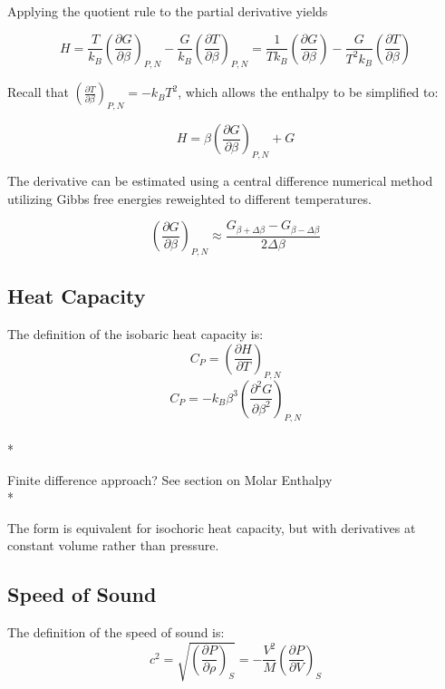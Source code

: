 \documentclass[a4paper,12pt]{article}
\begin{document}
 Applying the quotient rule to the partial derivative yields


\begin{equation}H = \frac{T}{k_B} \left(\frac{\partial G}{\partial \beta}\right)_{P, N} - \frac{G}{k_B}\left(\frac{\partial T}{\partial \beta}\right)_{P, N} = \frac{1}{T k_B} \left(\frac{\partial G}{\partial \beta}\right) - \frac{G}{T^2 k_B} \left(\frac{\partial T}{\partial \beta}\right)\end{equation}


 Recall that $\left(\frac{\partial T}{\partial \beta}\right)_{P, N} = -k_B T^2$, which allows the enthalpy to be simplified to:


\begin{equation} H = \beta \left(\frac{\partial G}{\partial \beta}\right)_{P, N} + G\end{equation}


 The derivative can be estimated using a central difference numerical method utilizing Gibbs free energies reweighted to different temperatures.

\begin{equation} \left( \frac{\partial G}{\partial \beta} \right)_{P,N} \approx \frac{G_{\beta + \Delta \beta} - G_{\beta -\Delta \beta}}{2\Delta \beta} \end{equation}

\subsection{Heat Capacity}
 The definition of the isobaric heat capacity is:
\begin{equation}C_P =\left( \frac{\partial H}{\partial T}\right)_{P,N}\end{equation}
\begin{equation}C_P =  -k_B \beta^3 \left(\frac{\partial^2 G}{\partial \beta^2}\right)_{P,N}\end{equation}\\*


 Finite difference approach? See section on Molar Enthalpy\\*

 The form is equivalent for isochoric heat capacity, but with derivatives at constant volume rather than pressure.

\subsection{Speed of Sound}
 The definition of the speed of sound is\cite{sos}:
\begin{equation}c^2 = \sqrt{\left(\frac{\partial P}{\partial \rho}\right)_{S}} = -\frac{V^2}{M}\left(\frac{\partial P}{\partial V}\right)_{S}\end{equation}
\end{document}
